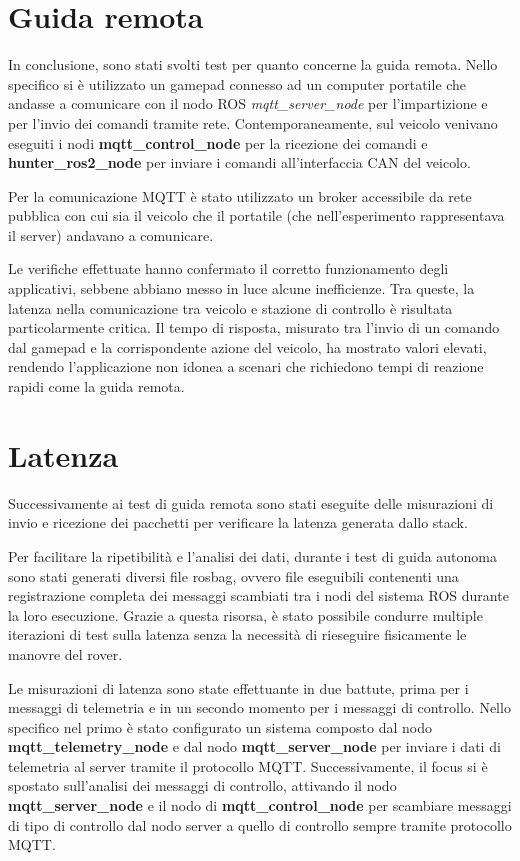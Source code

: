 \section{Guida remota}
In conclusione, sono stati svolti test per quanto concerne la guida remota. Nello specifico si è utilizzato un gamepad connesso ad un computer portatile che andasse a comunicare con il nodo ROS \textit{mqtt\_server\_node} per l'impartizione e per l'invio dei comandi tramite rete. Contemporaneamente, sul veicolo venivano eseguiti i nodi \textbf{mqtt\_control\_node} per la ricezione dei comandi e \textbf{hunter\_ros2\_node} per inviare i comandi all'interfaccia CAN del veicolo.

\noindent Per la comunicazione MQTT è stato utilizzato un broker accessibile da rete pubblica con cui sia il veicolo che il portatile (che nell'esperimento rappresentava il server) andavano a comunicare. 

\noindent Le verifiche effettuate hanno confermato il corretto funzionamento degli applicativi, sebbene abbiano messo in luce alcune inefficienze. Tra queste, la latenza nella comunicazione tra veicolo e stazione di controllo è risultata particolarmente critica. Il tempo di risposta, misurato tra l'invio di un comando dal gamepad e la corrispondente azione del veicolo, ha mostrato valori elevati, rendendo l'applicazione non idonea a scenari che richiedono tempi di reazione rapidi come la guida remota.

\section{Latenza}
Successivamente ai test di guida remota sono stati eseguite delle misurazioni di invio e ricezione dei pacchetti per verificare la latenza generata dallo stack. 

\noindent Per facilitare la ripetibilità e l'analisi dei dati, durante i test di guida autonoma sono stati generati diversi file rosbag, ovvero file eseguibili contenenti una registrazione completa dei messaggi scambiati tra i nodi del sistema ROS durante la loro esecuzione. Grazie a questa risorsa, è stato possibile condurre multiple iterazioni di test sulla latenza senza la necessità di rieseguire fisicamente le manovre del rover.

\noindent Le misurazioni di latenza sono state effettuante in due battute, prima per i messaggi di telemetria e in un secondo momento per i messaggi di controllo. Nello specifico nel primo è stato configurato un sistema composto dal nodo \textbf{mqtt\_telemetry\_node} e dal nodo \textbf{mqtt\_server\_node} per inviare i dati di telemetria al server tramite il protocollo MQTT. Successivamente, il focus si è spostato sull'analisi dei messaggi di controllo, attivando il nodo \textbf{mqtt\_server\_node} e il nodo di \textbf{mqtt\_control\_node} per scambiare messaggi di tipo 
 di controllo dal nodo server a quello di controllo sempre tramite protocollo MQTT.

